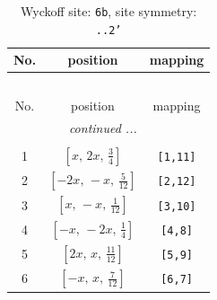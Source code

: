 \documentclass[fleqn,8pt]{jsarticle}
\begin{document}
\begin{longtable}{ccc}
\caption{Wyckoff site: {\tt 6b}, site symmetry: {\tt ..2'}}
 \\
 \hline \hline
No. & position & mapping \\ \hline \endfirsthead

\multicolumn{2}{l}{\tablename\ \thetable{}} \\
 \hline \hline
No. & position & mapping \\ \hline \endhead

 \hline \hline
\multicolumn{2}{r}{\footnotesize\it continued ...} \\ \endfoot

 \hline \hline
\multicolumn{2}{r}{} \\ \endlastfoot

1 & $\left[ x,\, 2 x,\, \frac{3}{4} \right]$ & {\tt [1,11]} \\ \hline
2 & $\left[ - 2 x,\, - x,\, \frac{5}{12} \right]$ & {\tt [2,12]} \\ \hline
3 & $\left[ x,\, - x,\, \frac{1}{12} \right]$ & {\tt [3,10]} \\ \hline
4 & $\left[ - x,\, - 2 x,\, \frac{1}{4} \right]$ & {\tt [4,8]} \\ \hline
5 & $\left[ 2 x,\, x,\, \frac{11}{12} \right]$ & {\tt [5,9]} \\ \hline
6 & $\left[ - x,\, x,\, \frac{7}{12} \right]$ & {\tt [6,7]} \\
\end{longtable}
\renewcommand{\arraystretch}{1.2}
\end{document}
